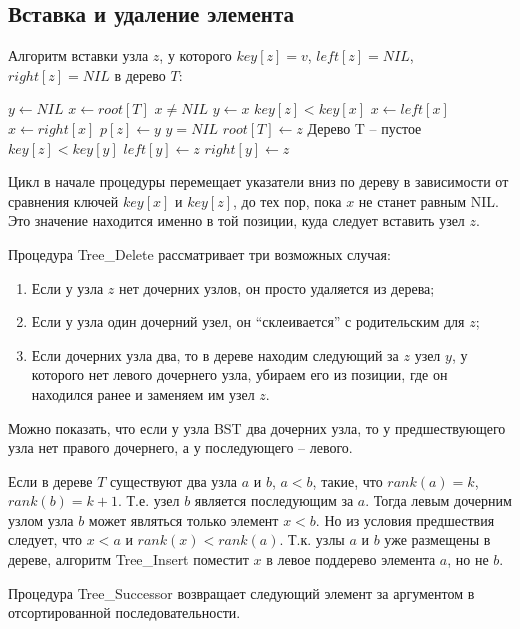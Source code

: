 \documentclass[11pt]{article}
\begin{document}
\subsection{Вставка и удаление элемента}
Алгоритм вставки узла $z$, у которого $key[z] = v$, $left[z] = NIL$,
$right[z] = NIL$ в дерево $T$:
\begin{codebox}
\li $y \gets NIL$
\li $x \gets root[T]$
\li \While $x \neq NIL$
\li   \Do $y \gets x$
\li     \If $key[z] < key[x]$
\li       \Then $x \gets left[x]$
\li       \Else $x \gets right[x]$
  \End
\End
\li $p[z] \gets y$
\li \If $y = NIL$
\li   \Then $root[T] \gets z$ \Comment Дерево T -- пустое
\li   \Else \If $key[z] < key[y]$
\li       \Then $left[y] \gets z$
\li       \Else $right[y] \gets z$
  \End
\End
\end{codebox}

Цикл в начале процедуры перемещает указатели вниз по дереву в зависимости от
сравнения ключей $key[x]$ и $key[z]$, до тех пор, пока $x$ не станет равным NIL.
Это значение находится именно в той позиции, куда следует вставить узел $z$.

Процедура Tree\_Delete рассматривает три возможных случая:
\begin{enumerate}
\item Если у узла $z$ нет дочерних узлов, он просто удаляется из дерева;
\item Если у узла один дочерний узел, он ``склеивается'' с родительским для $z$;
\item Если дочерних узла два, то в дереве находим следующий за $z$ узел $y$, у
  которого нет левого дочернего узла, убираем его из позиции, где он находился
  ранее и заменяем им узел $z$.
\end{enumerate}

Можно показать, что если у узла BST два дочерних узла, то у предшествующего
узла нет правого дочернего, а у последующего -- левого.

Если в дереве $T$ существуют два узла $a$ и $b$, $a < b$, такие, что
$rank(a) = k$, $rank(b) = k+1$. Т.е. узел $b$ является последующим за $a$.
Тогда левым дочерним узлом узла $b$ может являться только элемент $x < b$. Но
из условия предшествия следует, что $x < a$ и $rank(x) < rank(a)$. Т.к. узлы
$a$ и $b$ уже размещены в дереве, алгоритм Tree\_Insert поместит $x$ в
левое поддерево элемента $a$, но не $b$.

Процедура Tree\_Successor возвращает следующий элемент за аргументом в
отсортированной последовательности.
\end{document}

